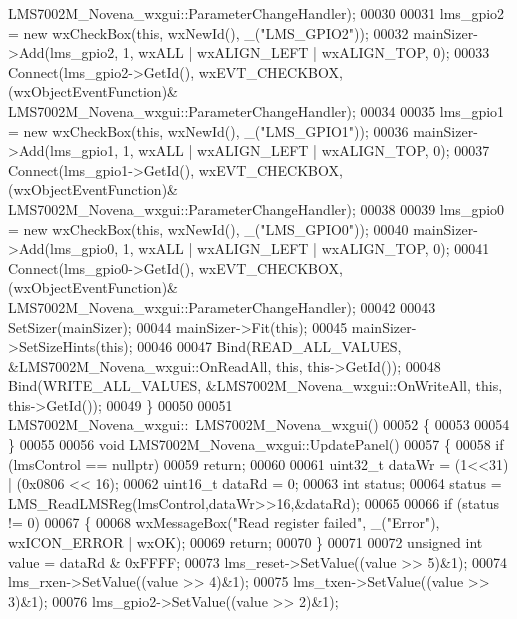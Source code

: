 \begin{DoxyCode}
      LMS7002M_Novena_wxgui::ParameterChangeHandler);
00030 
00031     lms\_gpio2 = \textcolor{keyword}{new} wxCheckBox(\textcolor{keyword}{this}, wxNewId(), \_(\textcolor{stringliteral}{"LMS\_GPIO2"}));
00032     mainSizer->Add(lms\_gpio2, 1, wxALL | wxALIGN\_LEFT | wxALIGN\_TOP, 0);
00033     Connect(lms\_gpio2->GetId(), wxEVT\_CHECKBOX, (wxObjectEventFunction)&
      LMS7002M_Novena_wxgui::ParameterChangeHandler);
00034 
00035     lms\_gpio1 = \textcolor{keyword}{new} wxCheckBox(\textcolor{keyword}{this}, wxNewId(), \_(\textcolor{stringliteral}{"LMS\_GPIO1"}));
00036     mainSizer->Add(lms\_gpio1, 1, wxALL | wxALIGN\_LEFT | wxALIGN\_TOP, 0);
00037     Connect(lms\_gpio1->GetId(), wxEVT\_CHECKBOX, (wxObjectEventFunction)&
      LMS7002M_Novena_wxgui::ParameterChangeHandler);
00038 
00039     lms\_gpio0 = \textcolor{keyword}{new} wxCheckBox(\textcolor{keyword}{this}, wxNewId(), \_(\textcolor{stringliteral}{"LMS\_GPIO0"}));
00040     mainSizer->Add(lms\_gpio0, 1, wxALL | wxALIGN\_LEFT | wxALIGN\_TOP, 0);
00041     Connect(lms\_gpio0->GetId(), wxEVT\_CHECKBOX, (wxObjectEventFunction)&
      LMS7002M_Novena_wxgui::ParameterChangeHandler);
00042 
00043     SetSizer(mainSizer);
00044     mainSizer->Fit(\textcolor{keyword}{this});
00045     mainSizer->SetSizeHints(\textcolor{keyword}{this});
00046 
00047     Bind(READ\_ALL\_VALUES, &LMS7002M_Novena_wxgui::OnReadAll, \textcolor{keyword}{this}, this->GetId());
00048     Bind(WRITE\_ALL\_VALUES, &LMS7002M_Novena_wxgui::OnWriteAll, \textcolor{keyword}{this}, this->GetId());
00049 \}
00050 
00051 LMS7002M_Novena_wxgui::~LMS7002M_Novena_wxgui()
00052 \{
00053 
00054 \}
00055 
00056 \textcolor{keywordtype}{void} LMS7002M_Novena_wxgui::UpdatePanel()
00057 \{
00058     \textcolor{keywordflow}{if} (lmsControl == \textcolor{keyword}{nullptr})
00059         \textcolor{keywordflow}{return};
00060 
00061     uint32\_t dataWr = (1<<31) | (0x0806 << 16);
00062     uint16\_t dataRd = 0;
00063     \textcolor{keywordtype}{int} status;
00064     status = LMS_ReadLMSReg(lmsControl,dataWr>>16,&dataRd);
00065 
00066     \textcolor{keywordflow}{if} (status != 0)
00067     \{
00068         wxMessageBox(\textcolor{stringliteral}{"Read register failed"}, \_(\textcolor{stringliteral}{"Error"}), wxICON\_ERROR | wxOK);
00069         \textcolor{keywordflow}{return};
00070     \}
00071 
00072     \textcolor{keywordtype}{unsigned} \textcolor{keywordtype}{int} value = dataRd & 0xFFFF;
00073     lms_reset->SetValue((value >> 5)&1);
00074     lms_rxen->SetValue((value >> 4)&1);
00075     lms_txen->SetValue((value >> 3)&1);
00076     lms_gpio2->SetValue((value >> 2)&1);

\end{DoxyCode}
